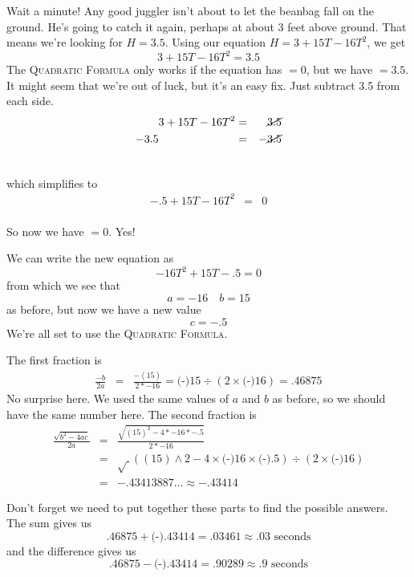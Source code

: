 Wait a minute!  Any good juggler isn't about to let the beanbag fall on the ground.  He's going to catch it again, perhaps at about 3 feet above ground.  
That means we're looking for $H=3.5$.  Using our equation $H=3+15T-16T^2$, we get $$3+15T-16T^2=3.5$$ The \textsc{Quadratic Formula} only works if the equation has $=0$, but we have $=3.5$.  It might seem that we're out of luck, but it's an easy fix.  Just subtract 3.5 from each side. 
\begin{eqnarray} \nonumber
3+15T-16T^2 & = & \cancel{3.5} \\ \nonumber
-3.5 \hspace{.9in}~ & = &-\cancel{3.5}\\ \nonumber %
\end{eqnarray}
\vspace{-.5in} %

\noindent 
which simplifies to
\begin{eqnarray} \nonumber
-.5+15T -16T^2 & = & 0 \\ \nonumber
\end{eqnarray}
\vspace{-.5in} %

\noindent So now we have $=0$.  Yes!

We can write the new equation as $$-16T^2 + 15T -.5= 0$$ from which we see that $$a = -16 \quad b = 15$$ as before, but now we have a new value $$c=-.5$$   We're all set to use the \textsc{Quadratic Formula}.  

The first fraction is 
 \begin{eqnarray*}
\frac{-b}{2a} & = &  \frac{-(15)}{2 \ast -16} =  \text{(-)}15 \div (2 \times  \text{(-)}16) = .46875
\end{eqnarray*}
No surprise here.  We used the same values of $a$ and $b$ as before, so we should have the same number here.
The second fraction is \begin{eqnarray*}
\frac{\sqrt{b^2-4ac}}{2a} & = &   \frac{\sqrt{(15)^2-4 \ast -16 \ast -.5}}{2 \ast-16}\\
& = &   \sqrt{~} ( (15) \wedge 2 - 4 \times  \text{(-)}16 \times  \text{(-)}.5) \div (2 \times  \text{(-)}16)\\
& =  & -.43413887\ldots \approx -.43414
\end{eqnarray*}

Don't forget we need to put together these parts to find the possible answers.  The sum gives us $$.46875 +  \text{(-)}.43414 = .03461 \approx .03 \text{ seconds}$$ and the difference gives us $$.46875 -  \text{(-)}.43414 = .90289 \approx .9 \text{ seconds}$$  

